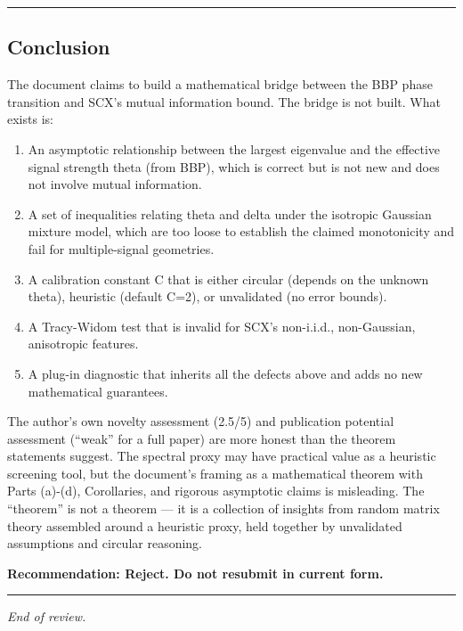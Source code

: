 \documentclass[
  12pt,
]{article}
\begin{document}
\begin{center}\rule{0.5\linewidth}{0.5pt}\end{center}

\subsection{Conclusion}\label{conclusion}

The document claims to build a mathematical bridge between the BBP phase
transition and SCX's mutual information bound. The bridge is not built.
What exists is:

\begin{enumerate}
\def\labelenumi{\arabic{enumi}.}
\item
  An asymptotic relationship between the largest eigenvalue and the
  effective signal strength theta (from BBP), which is correct but is
  not new and does not involve mutual information.
\item
  A set of inequalities relating theta and delta under the isotropic
  Gaussian mixture model, which are too loose to establish the claimed
  monotonicity and fail for multiple-signal geometries.
\item
  A calibration constant C that is either circular (depends on the
  unknown theta), heuristic (default C=2), or unvalidated (no error
  bounds).
\item
  A Tracy-Widom test that is invalid for SCX's non-i.i.d., non-Gaussian,
  anisotropic features.
\item
  A plug-in diagnostic that inherits all the defects above and adds no
  new mathematical guarantees.
\end{enumerate}

The author's own novelty assessment (2.5/5) and publication potential
assessment (``weak'' for a full paper) are more honest than the theorem
statements suggest. The spectral proxy may have practical value as a
heuristic screening tool, but the document's framing as a mathematical
theorem with Parts (a)-(d), Corollaries, and rigorous asymptotic claims
is misleading. The ``theorem'' is not a theorem --- it is a collection
of insights from random matrix theory assembled around a heuristic
proxy, held together by unvalidated assumptions and circular reasoning.

\textbf{Recommendation: Reject. Do not resubmit in current form.}

\begin{center}\rule{0.5\linewidth}{0.5pt}\end{center}

\emph{End of review.}
\end{document}

